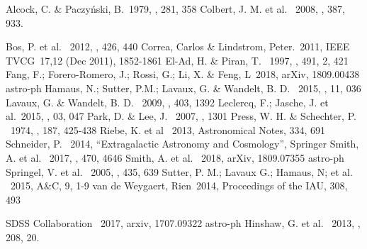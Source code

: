 \documentclass[preprint]{aastex62}
\begin{document}
  \nocite{*}

  \begin{thebibliography}{}

   Alcock, C. \& Paczy\'nski, B.\ 1979, \nat, 281, 358    
     Colbert, J. M. et al. \ 2008, \mnras, 387, 933. %

     Bos, P. et al. \ 2012, \mnras, 426, 440 %
     Correa, Carlos \& Lindstrom, Peter.\ 2011,  IEEE TVCG\ 17,12 (Dec 2011), 1852-1861
     El-Ad, H. \& Piran, T. \ 1997, \apj, 491, 2, 421
     Fang, F.; Forero-Romero, J.; Rossi, G.; Li, X. \& Feng, L\ 2018, arXiv, 1809.00438 astro-ph %
     Hamaus, N.; Sutter, P.M.; Lavaux, G. \& Wandelt, B. D. \ 2015, \jcap, 11, 036    
     Lavaux, G. \& Wandelt, B. D. \ 2009, \mnras, 403, 1392
     Leclercq, F.; Jasche, J. et al.\ 2015, \jcap, 03, 047
     Park, D. \& Lee, J. \ 2007, , 1301 %
     Press, W. H. \& Schechter, P. \ 1974, \apj, 187, 425-438
     Riebe, K. et al \ 2013, Astronomical Notes, 334, 691 %
     Schneider, P. \ 2014, ``Extragalactic Astronomy and Cosmology'', Springer
     Smith, A. et al. \ 2017, \mnras, 470, 4646 %
     Smith, A. et al. \ 2018, arXiv, 1809.07355 astro-ph %
     Springel, V. et al. \ 2005, \nat, 435, 639 %
     Sutter, P. M.; Lavaux G.; Hamaus, N; et al. \ 2015, A\&C, 9, 1-9 %
     van de Weygaert, Rien\ 2014, Proceedings of the IAU, 308, 493 %

     SDSS Collaboration \ 2017, arxiv, 1707.09322 astro-ph %
     Hinshaw, G. et al. \ 2013, \apjs, 208, 20. %
  \end{thebibliography}                                                           
                       

\end{document}
